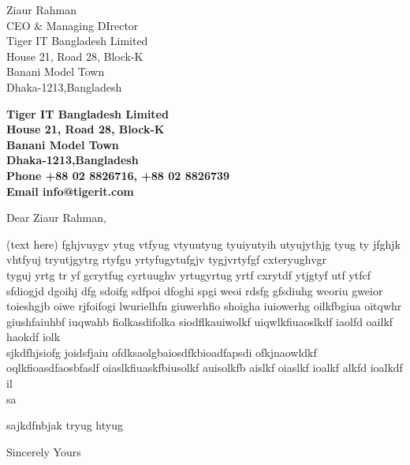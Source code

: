 \documentclass[12pt]{letter}
\begin{document}
	\begin{letter}
		{Ziaur Rahman\\
		CEO \& Managing DIrector\\
		Tiger IT Bangladesh Limited\\
		House 21, Road 28, Block-K\\ 
		Banani Model Town\\
		Dhaka-1213,Bangladesh}
		\begin{center}
			\large{\bf{Tiger IT Bangladesh Limited \\}
			\small\textbf{ House 21, Road 28, Block-K \\
			Banani Model Town \\
			Dhaka-1213,Bangladesh \\
			Phone +88 02 8826716, +88 02 8826739 \\
			Email info@tigerit.com \\}}
		\end{center}
		\signature{------------------------------- \\ Md. Rafiul Islam}
		\opening{Dear Ziaur Rahman,}
		(text here) fghjvuygv ytug vtfyug vtyuutyug tyuiyutyih utyujythjg tyug ty jfghjk vhtfyuj tryutjgytrg
		rtyfgu yrtyfugytufgjv tygjvrtyfgf cxteryughvgr \\ tyguj yrtg tr yf gcrytfug cyrtuughv yrtugyrtug
		yrtf cxrytdf ytjgtyf utf ytfcf sfdiogjd dgoihj dfg sdoifg sdfpoi dfoghi spgi weoi rdsfg
		gfsdiuhg weoriu gweior toieshgjb oiwe rjfoifogi lwurielhfn giuwerhfio shoigha iuiowerhg oilkfbgiua oitqwhr giushfaiuhbf iuqwahb fiolkasdifolka siodflkauiwolkf uiqwlkfiuaoslkdf iaolfd oailkf haokdf iolk \\
		sjkdfhjsiofg joidsfjaiu ofdksaolgbaiosdfkbioadfapsdi ofkjnaowldkf oqlkfioasdfaosbfaslf oiaslkfiuaskfbiusolkf auisolkfb aislkf oiaslkf ioalkf alkfd ioalkdf il \\sa
		
		sajkdfnbjak
		tryug htyug
		
		\closing{Sincerely Yours}
		
	\end{letter}	
\end{document}
